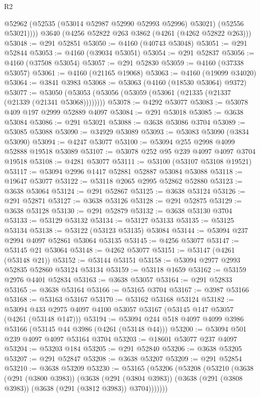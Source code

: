 \begin{lexlean}{R2}
\begin{coremodule}
          @52962
          (@52535 (@53014 @52987 @52990 @52993 @52996) @53021)
          (@52556 @53021))))
    @3640
    (@4256 @52822 @263 @3862 (@4261 (@4262 @52822 @263)))
@53048 := @291 @52851
@53050 := @4160 (@40743 @53048)
@53051 := @291 @52844
@53053 := @4160 (@39034 @53051)
@53054 := @291 @52837
@53056 := @4160 (@37508 @53054)
@53057 := @291 @52830
@53059 := @4160 (@37338 @53057)
@53061 := @4160 (@21165 @19068)
@53063 := @4160 (@19099 @34020)
@53064 := @3841 @3983
@53068 := @53063 (@4160 (@18530 @53064) @9372)
@53077 := @53050 (@53053 (@53056 (@53059 (@53061 (@21335 (@21337 (@21339 (@21341 @53068))))))))
@53078 := @4292 @53077
@53083 := @53078 @409 @197 @2999 @52889 @4097
@53084 := @291 @53018
@53085 := @3638 @53084
@53086 := @291 @53021
@53088 := @3638 @53086 @3704
@53089 := @53085 @53088
@53090 := @34929 @53089
@53093 := @53083 @53090 (@3834 @53090)
@53094 := @4247 @53077
@53100 := @53094 @255 @2998 @4099 @52888 @19518 @53089
@53107 := @53078 @252 @95 @239 @4097 @4097 @3704 @19518
@53108 := @4281 @53077
@53111 := @53100 (@53107 @53108 @19521)
@53117 := @53094 @2996 @1417 @52881 @52887 @53084 @53088
@53118 := @19647 @53077
@53122 := @53118 @2065 @2995 @52862 @52880
@53123 := @3638 @53064
@53124 := @291 @52867
@53125 := @3638 @53124
@53126 := @291 @52871
@53127 := @3638 @53126
@53128 := @291 @52875
@53129 := @3638 @53128
@53130 := @291 @52879
@53132 := @3638 @53130 @3704
@53133 := @53129 @53132
@53134 := @53127 @53133
@53135 := @53125 @53134
@53138 := @53122 (@53123 @53135) @53084
@53144 := @53094 @237 @2994 @4097 @52861 @53064 @53135
@53145 := @4256 @53077
@53147 := @53145 @21 @53064
@53148 := @4262 @53077
@53151 := @53147 (@4261 (@53148 @21))
@53152 := @53144 @53151
@53158 := @53094 @2977 @2993 @52835 @52860 @53124 @53134
@53159 := @53118 @1659
@53162 := @53159 @2976 @4401 @52834
@53163 := @3638 @53057
@53164 := @291 @52833
@53165 := @3638 @53164
@53166 := @53165 @3704
@53167 := @3987 @53166
@53168 := @53163 @53167
@53170 := @53162 @53168 @53124
@53182 := @53094 @433 @2975 @4097 @4100 @53057 @53167 (@53145 @147 @53057 (@4261 (@53148 @147)))
@53194 := @53094 @244 @518 @4097 @4099 @3986 @53166 (@53145 @44 @3986 (@4261 (@53148 @44)))
@53200 := @53094 @501 @239 @4097 @4097 @53164 @3704
@53203 := @18601 @53077 @237 @4097
@53204 := @53203 @184
@53205 := @291 @52840
@53206 := @3638 @53205
@53207 := @291 @52847
@53208 := @3638 @53207
@53209 := @291 @52854
@53210 := @3638 @53209
@53230 := @53165
    (@53206
      (@53208
        (@53210
          (@3638
            (@291 (@3800 @3983))
            (@3638
              (@291 (@3804 @3983))
              (@3638 (@291 (@3808 @3983)) (@3638 (@291 (@3812 @3983)) @3704)))))))

\end{coremodule}
\end{lexlean}
